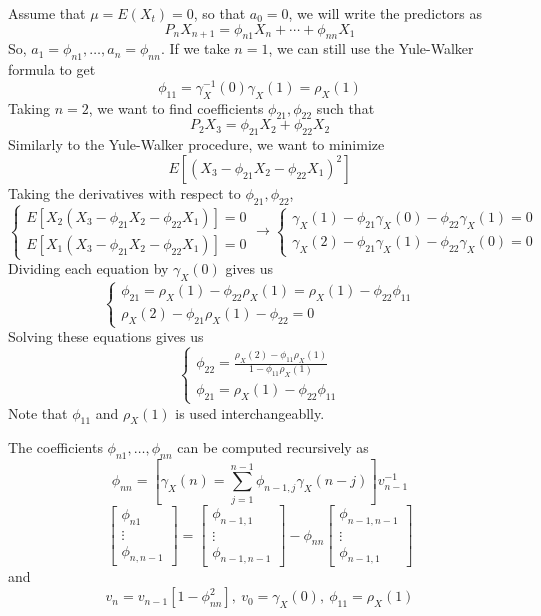 Assume that $\mu = E(X_t) = 0$, so that $a_0 = 0$, we will write the predictors as 
\[P_nX_{n+1} = \phi_{n1}X_n + \cdots + \phi_{nn}X_1\]
So, $a_1 = \phi_{n1}, \ldots, a_n = \phi_{nn}$. If we take $n=1$, we can still use the Yule-Walker formula to get 
\[\phi_{11} = \gamma_X^{-1}(0)\gamma_X(1) = \rho_X(1)\]
Taking $n=2$, we want to find coefficients $\phi_{21}, \phi_{22}$ such that
\[P_2X_3 = \phi_{21}X_2 + \phi_{22}X_2\]
Similarly to the Yule-Walker procedure, we want to minimize
\[E[(X_3 - \phi_{21}X_2 - \phi_{22}X_1)^2]\]
Taking the derivatives with respect to $\phi_{21}, \phi_{22}$,
\[\begin{cases}
    E[X_2(X_3 - \phi_{21}X_2 - \phi_{22}X_1)] = 0\\
    E[X_1(X_3 - \phi_{21}X_2 - \phi_{22}X_1)] = 0
\end{cases} \rightarrow \begin{cases}
    \gamma_X(1) - \phi_{21}\gamma_X(0) - \phi_{22}\gamma_X(1) = 0\\
    \gamma_X(2) - \phi_{21}\gamma_X(1) - \phi_{22}\gamma_X(0) = 0
\end{cases}\]
Dividing each equation by $\gamma_X(0)$ gives us 
\[\begin{cases}
    \phi_{21} = \rho_X(1) - \phi_{22}\rho_X(1) = \rho_X(1) - \phi_{22}\phi_{11}\\
    \rho_X(2) - \phi_{21}\rho_X(1) - \phi_{22} = 0
\end{cases}\]
Solving these equations gives us 
\[\begin{cases}
    \phi_{22} = \frac{\rho_X(2) - \phi_{11}\rho_X(1)}{1-\phi_{11}\rho_X(1)}\\
    \phi_{21} = \rho_X(1) - \phi_{22}\phi_{11}
\end{cases}\]
Note that $\phi_{11}$ and $\rho_X(1)$ is used interchangeablly.

\begin{theorem}
    The coefficients $\phi_{n1}, \ldots, \phi_{nn}$ can be computed recursively as 
    \[\phi_{nn} = \left[\gamma_X(n) = \sum_{j=1}^{n-1}\phi_{n-1,j}\gamma_X(n-j)\right]v_{n-1}^{-1}\]
    \[\begin{bmatrix}
        \phi_{n1} \\ \vdots \\ \phi_{n,n-1}
    \end{bmatrix} = \begin{bmatrix}
        \phi_{n-1,1}\\ \vdots \\ \phi_{n-1,n-1}
    \end{bmatrix} - \phi_{nn}\begin{bmatrix}
        \phi_{n-1,n-1} \\ \vdots \\ \phi_{n-1,1}
    \end{bmatrix}\]
    and 
    \[v_n = v_{n-1}[1-\phi_{nn}^2], \ v_0 = \gamma_X(0), \ \phi_{11} = \rho_X(1)\]
\end{theorem}


